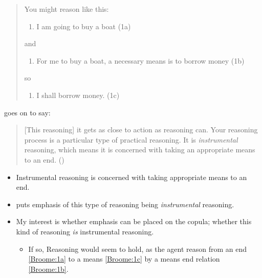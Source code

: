 \documentclass[10pt]{article}
\newcommand{\schemaName}[1]{\textsf{#1}}
\begin{document}
\begin{quote}
  You might reason like this:

  \begin{enumerate}[label={\color{white} (1\alph*)}, ref=(1\alph*)]
  \item\label{Broome:1a} I am going to buy a boat \hfill (1a)
  \end{enumerate}

  and

  \begin{enumerate}[label={\color{white} (1\alph*)}, ref=(1\alph*), resume]
  \item\label{Broome:1b} For me to buy a boat, a necessary means is to borrow money \hfill (1b)
  \end{enumerate}
  so

  \begin{enumerate}[label={\color{white} (1\alph*)}, ref=(1\alph*), resume]
  \item\label{Broome:1c} I shall borrow money. \hfill (1c)
  \end{enumerate}

\end{quote}

\citeauthor{Broome:2002aa} goes on to say:

\begin{quote}
  [This reasoning] it gets as close to action as reasoning can.
  Your reasoning process is a particular type of practical reasoning.
  It is \emph{instrumental} reasoning, which means it is concerned with taking an appropriate means to an end.\nolinebreak
  \mbox{}\hfill\mbox{(\citeyear[86]{Broome:2002aa})}
\end{quote}

\begin{itemize}[noitemsep]
\item Instrumental reasoning is concerned with taking appropriate means to an end.
\item \citeauthor{Broome:2002aa} puts emphasis of this type of reasoning being \emph{instrumental} reasoning.
\item My interest is whether emphasis can be placed on the copula; whether this kind of reasoning \emph{is} instrumental reasoning.
  \begin{itemize}[noitemsep]
  \item If so, \schemaName{Reasoning} would seem to hold, as the agent reason from an end \ref{Broome:1a} to a means \ref{Broome:1c} by a means end relation \ref{Broome:1b}.
  \end{itemize}
\end{itemize}
\end{document}
